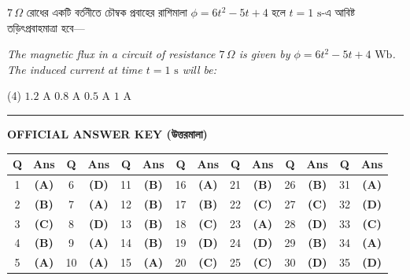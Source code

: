 \documentclass[13pt,a4paper]{extarticle}
\newcommand{\questionheader}[1]{%
  \vspace{0.4cm}\noindent{\Large\textbf{#1}}\vspace{0.12cm}%
}
\begin{document}
\questionheader{Question 35}

{\bengalifont $7\,\Omega$ রোধের একটি বর্তনীতে চৌম্বক প্রবাহের রাশিমালা $\phi = 6t^2 - 5t + 4$ হলে $t = 1\text{ s}$-এ আবিষ্ট তড়িৎপ্রবাহমাত্রা হবে—}

\vspace{0.08cm}
\textit{The magnetic flux in a circuit of resistance $7\,\Omega$ is given by $\phi = 6t^2 - 5t + 4\text{ Wb}$. The induced current at time $t = 1\text{ s}$ will be:}

\begin{tasks}(4)
  \task $1.2\text{ A}$
  \task $0.8\text{ A}$
  \task $0.5\text{ A}$
  \task $1\text{ A}$
\end{tasks}

\vspace{0.8cm}
\noindent\rule{\textwidth}{1.2pt}
\vspace{0.3cm}

\begin{center}
{\Large\textbf{OFFICIAL ANSWER KEY (উত্তরমালা)}}\\[6pt]
\begin{tabular}{|c|c||c|c||c|c||c|c||c|c||c|c||c|c|}
\hline
\textbf{Q} & \textbf{Ans} & \textbf{Q} & \textbf{Ans} & \textbf{Q} & \textbf{Ans} & \textbf{Q} & \textbf{Ans} & \textbf{Q} & \textbf{Ans} & \textbf{Q} & \textbf{Ans} & \textbf{Q} & \textbf{Ans} \\
\hline
1 & \textbf{(A)} & 6 & \textbf{(D)} & 11 & \textbf{(B)} & 16 & \textbf{(A)} & 21 & \textbf{(B)} & 26 & \textbf{(B)} & 31 & \textbf{(A)} \\
2 & \textbf{(B)} & 7 & \textbf{(A)} & 12 & \textbf{(B)} & 17 & \textbf{(B)} & 22 & \textbf{(C)} & 27 & \textbf{(C)} & 32 & \textbf{(D)} \\
3 & \textbf{(C)} & 8 & \textbf{(D)} & 13 & \textbf{(B)} & 18 & \textbf{(C)} & 23 & \textbf{(A)} & 28 & \textbf{(D)} & 33 & \textbf{(C)} \\
4 & \textbf{(B)} & 9 & \textbf{(A)} & 14 & \textbf{(B)} & 19 & \textbf{(D)} & 24 & \textbf{(D)} & 29 & \textbf{(B)} & 34 & \textbf{(A)} \\
5 & \textbf{(A)} & 10 & \textbf{(A)} & 15 & \textbf{(A)} & 20 & \textbf{(C)} & 25 & \textbf{(C)} & 30 & \textbf{(D)} & 35 & \textbf{(D)} \\
\hline
\end{tabular}
\end{center}
\end{document}
